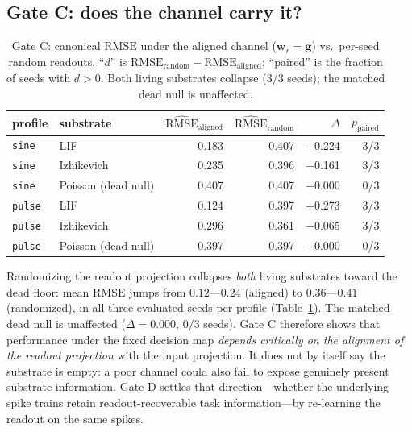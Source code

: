 \documentclass[12pt]{article}
\begin{document}
\subsection{Gate C: does the channel carry it?}\label{sec:gatecres}
\begin{table}[H]
\centering
\caption{Gate C: canonical $\mathrm{RMSE}$ under the aligned channel
($\mathbf{w}_r=\mathbf{g}$) vs.\ per-seed random readouts. ``$d$'' is
$\mathrm{RMSE}_{\mathrm{random}}-\mathrm{RMSE}_{\mathrm{aligned}}$; ``paired'' is the
fraction of seeds with $d>0$. Both living substrates collapse
(3/3 seeds); the matched dead null is unaffected.}
\label{tab:gatec}
\begin{tabular}{llrrrr}
\toprule
profile & substrate & $\widehat{\mathrm{RMSE}}_{\mathrm{aligned}}$ & $\widehat{\mathrm{RMSE}}_{\mathrm{random}}$ & $\Delta$ & $p_{\mathrm{paired}}$ \\
\midrule
\texttt{sine} & LIF & 0.183 & 0.407 & +0.224 & 3/3 \\
\texttt{sine} & Izhikevich & 0.235 & 0.396 & +0.161 & 3/3 \\
\texttt{sine} & Poisson (dead null) & 0.407 & 0.407 & +0.000 & 0/3 \\
\texttt{pulse} & LIF & 0.124 & 0.397 & +0.273 & 3/3 \\
\texttt{pulse} & Izhikevich & 0.296 & 0.361 & +0.065 & 3/3 \\
\texttt{pulse} & Poisson (dead null) & 0.397 & 0.397 & +0.000 & 0/3 \\
\bottomrule
\end{tabular}
\end{table}
Randomizing the readout projection collapses \emph{both} living
substrates toward the dead floor: mean $\mathrm{RMSE}$ jumps from $0.12$---$0.24$
(aligned) to $0.36$---$0.41$ (randomized), in all three evaluated seeds
per profile (Table~\ref{tab:gatec}). The matched dead null is
unaffected ($\Delta=0.000$, $0/3$ seeds). Gate C therefore shows that
performance under the fixed decision map \emph{depends critically on
the alignment of the readout projection} with the input projection.
It does not by itself say the substrate is empty: a poor channel could
also fail to expose genuinely present substrate information. Gate D
settles that direction---whether the underlying spike trains retain
readout-recoverable task information---by re-learning the readout on the
same spikes.
\end{document}
